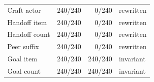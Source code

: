 \begin{tabularx}{\textwidth}{@{}Z r r Z@{}}
  \toprule
   &  &  &  \\
  \midrule
  Craft actor & 240/240 & 0/240 & rewritten \\
  Handoff item & 240/240 & 0/240 & rewritten \\
  Handoff count & 240/240 & 0/240 & rewritten \\
  Peer suffix & 240/240 & 0/240 & rewritten \\
  Goal item & 240/240 & 240/240 & invariant \\
  Goal count & 240/240 & 240/240 & invariant \\
  \bottomrule
\end{tabularx}
